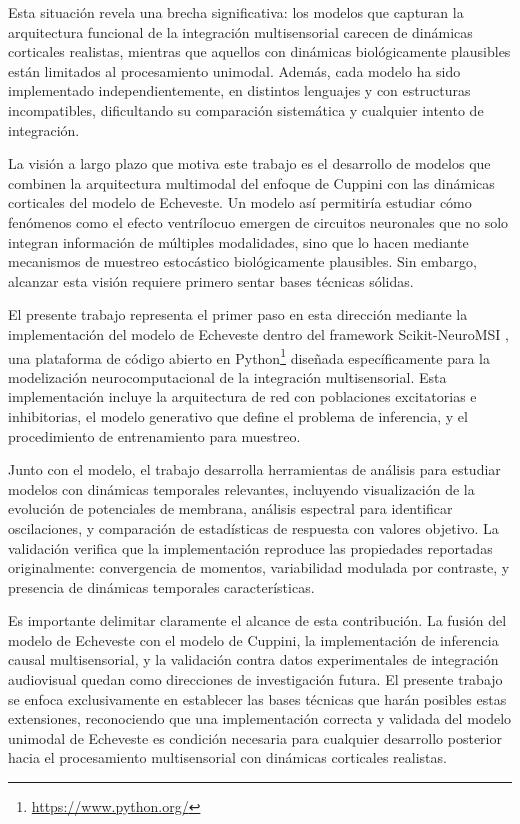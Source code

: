Esta situación revela una brecha significativa: los modelos que capturan la arquitectura funcional de la integración multisensorial carecen de dinámicas corticales realistas, mientras que aquellos con dinámicas biológicamente plausibles están limitados al procesamiento unimodal. Además, cada modelo ha sido implementado independientemente, en distintos lenguajes y con estructuras incompatibles, dificultando su comparación sistemática y cualquier intento de integración.

La visión a largo plazo que motiva este trabajo es el desarrollo de modelos que combinen la arquitectura multimodal del enfoque de Cuppini con las dinámicas corticales del modelo de Echeveste. Un modelo así permitiría estudiar cómo fenómenos como el efecto ventrílocuo emergen de circuitos neuronales que no solo integran información de múltiples modalidades, sino que lo hacen mediante mecanismos de muestreo estocástico biológicamente plausibles. Sin embargo, alcanzar esta visión requiere primero sentar bases técnicas sólidas.

El presente trabajo representa el primer paso en esta dirección mediante la implementación del modelo de Echeveste dentro del framework Scikit-NeuroMSI \citep{paredes2025scikit}, una plataforma de código abierto en Python\footnote{\url{https://www.python.org/}} diseñada específicamente para la modelización neurocomputacional de la integración multisensorial. Esta implementación incluye la arquitectura de red con poblaciones excitatorias e inhibitorias, el modelo generativo que define el problema de inferencia, y el procedimiento de entrenamiento para muestreo.

Junto con el modelo, el trabajo desarrolla herramientas de análisis para estudiar modelos con dinámicas temporales relevantes, incluyendo visualización de la evolución de potenciales de membrana, análisis espectral para identificar oscilaciones, y comparación de estadísticas de respuesta con valores objetivo. La validación verifica que la implementación reproduce las propiedades reportadas originalmente: convergencia de momentos, variabilidad modulada por contraste, y presencia de dinámicas temporales características.

Es importante delimitar claramente el alcance de esta contribución. La fusión del modelo de Echeveste con el modelo de Cuppini, la implementación de inferencia causal multisensorial, y la validación contra datos experimentales de integración audiovisual quedan como direcciones de investigación futura. El presente trabajo se enfoca exclusivamente en establecer las bases técnicas que harán posibles estas extensiones, reconociendo que una implementación correcta y validada del modelo unimodal de Echeveste es condición necesaria para cualquier desarrollo posterior hacia el procesamiento multisensorial con dinámicas corticales realistas.

